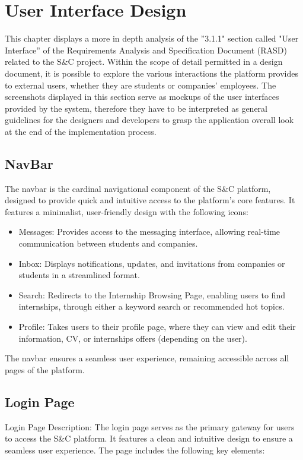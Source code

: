 \chapter{User Interface Design}
This chapter displays a more in depth analysis of the ”3.1.1" section called "User Interface” of the
 Requirements Analysis and
 Specification Document (RASD) related to the S\&C project. 
 Within the scope of detail permitted in a design document, 
 it is possible to explore the various interactions the platform provides to external users,
  whether they are students or companies' employees.
 The screenshots displayed in this section serve as mockups of the user interfaces provided by the system, 
 therefore they have to be interpreted as general guidelines for the designers and developers to
 grasp the application overall look at the end of the implementation process.



\section{NavBar}
The navbar is the cardinal navigational component of the S\&C platform, 
designed to provide quick and intuitive access to the platform's core features. 
It features a minimalist, user-friendly design with the following icons:  

\begin{itemize}
    \item Messages: Provides access to the messaging interface, 
    allowing real-time communication between students and companies.  
    \item Inbox: Displays notifications, updates, 
    and invitations from companies or students in a streamlined format.  
    \item Search: Redirects to the Internship Browsing Page,
    enabling users to find internships, through either a keyword search or recommended hot topics.
    \item Profile: Takes users to their profile page, 
    where they can view and edit their information, CV, or internships offers (depending on the user).  
\end{itemize}
The navbar ensures a seamless user experience, remaining accessible across all pages of the platform.

\section{Login Page}
Login Page Description:
The login page serves as the primary gateway for users to access the S\&C platform. 
It features a clean and intuitive design to ensure a seamless user experience. 
The page includes the following key elements:

